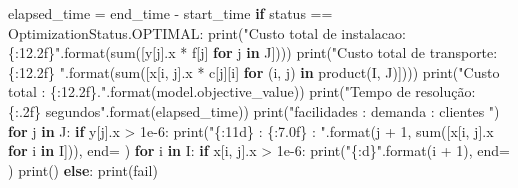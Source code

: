 \documentclass[
  letterpaper,
  DIV=11,
  numbers=noendperiod]{scrartcl}
\newenvironment{Shaded}{\begin{snugshade}}{\end{snugshade}}
\newcommand{\BuiltInTok}[1]{\textcolor[rgb]{0.00,0.23,0.31}{#1}}
\newcommand{\ControlFlowTok}[1]{\textcolor[rgb]{0.00,0.23,0.31}{\textbf{#1}}}
\newcommand{\DecValTok}[1]{\textcolor[rgb]{0.68,0.00,0.00}{#1}}
\newcommand{\FloatTok}[1]{\textcolor[rgb]{0.68,0.00,0.00}{#1}}
\newcommand{\KeywordTok}[1]{\textcolor[rgb]{0.00,0.23,0.31}{\textbf{#1}}}
\newcommand{\NormalTok}[1]{\textcolor[rgb]{0.00,0.23,0.31}{#1}}
\newcommand{\OperatorTok}[1]{\textcolor[rgb]{0.37,0.37,0.37}{#1}}
\newcommand{\SpecialCharTok}[1]{\textcolor[rgb]{0.37,0.37,0.37}{#1}}
\newcommand{\StringTok}[1]{\textcolor[rgb]{0.13,0.47,0.30}{#1}}
\begin{document}
\begin{Shaded}
\begin{Highlighting}[]
\NormalTok{    elapsed\_time }\OperatorTok{=}\NormalTok{ end\_time }\OperatorTok{{-}}\NormalTok{ start\_time    }
    \ControlFlowTok{if}\NormalTok{ status }\OperatorTok{==}\NormalTok{ OptimizationStatus.OPTIMAL:}
        \BuiltInTok{print}\NormalTok{(}\StringTok{"Custo total de instalacao: }\SpecialCharTok{\{:12.2f\}}\StringTok{"}\NormalTok{.}\BuiltInTok{format}\NormalTok{(}\BuiltInTok{sum}\NormalTok{([y[j].x }\OperatorTok{*}\NormalTok{ f[j] }\ControlFlowTok{for}\NormalTok{ j }\KeywordTok{in}\NormalTok{ J])))}
        \BuiltInTok{print}\NormalTok{(}\StringTok{"Custo total de transporte: }\SpecialCharTok{\{:12.2f\}}\StringTok{ "}\NormalTok{.}\BuiltInTok{format}\NormalTok{(}\BuiltInTok{sum}\NormalTok{([x[i, j].x }\OperatorTok{*}\NormalTok{ c[j][i] }\ControlFlowTok{for}\NormalTok{ (i, j) }\KeywordTok{in}\NormalTok{ product(I, J)])))}
        \BuiltInTok{print}\NormalTok{(}\StringTok{"Custo total : }\SpecialCharTok{\{:12.2f\}}\StringTok{."}\NormalTok{.}\BuiltInTok{format}\NormalTok{(model.objective\_value))}
        \BuiltInTok{print}\NormalTok{(}\StringTok{"Tempo de resolução: }\SpecialCharTok{\{:.2f\}}\StringTok{ segundos"}\NormalTok{.}\BuiltInTok{format}\NormalTok{(elapsed\_time))}
        \BuiltInTok{print}\NormalTok{(}\StringTok{"facilidades : demanda : clientes "}\NormalTok{)}
        \ControlFlowTok{for}\NormalTok{ j }\KeywordTok{in}\NormalTok{ J:}
            \ControlFlowTok{if}\NormalTok{ y[j].x }\OperatorTok{\textgreater{}} \FloatTok{1e{-}6}\NormalTok{:}
                \BuiltInTok{print}\NormalTok{(}\StringTok{"}\SpecialCharTok{\{:11d\}}\StringTok{ : }\SpecialCharTok{\{:7.0f\}}\StringTok{ : "}\NormalTok{.}\BuiltInTok{format}\NormalTok{(j }\OperatorTok{+} \DecValTok{1}\NormalTok{, }\BuiltInTok{sum}\NormalTok{([x[i, j].x }\ControlFlowTok{for}\NormalTok{ i }\KeywordTok{in}\NormalTok{ I])), end}\OperatorTok{=}\StringTok{\textquotesingle{} \textquotesingle{}}\NormalTok{)}
                \ControlFlowTok{for}\NormalTok{ i }\KeywordTok{in}\NormalTok{ I:}
                    \ControlFlowTok{if}\NormalTok{ x[i, j].x }\OperatorTok{\textgreater{}} \FloatTok{1e{-}6}\NormalTok{:}
                        \BuiltInTok{print}\NormalTok{(}\StringTok{"}\SpecialCharTok{\{:d\}}\StringTok{"}\NormalTok{.}\BuiltInTok{format}\NormalTok{(i }\OperatorTok{+} \DecValTok{1}\NormalTok{), end}\OperatorTok{=}\StringTok{\textquotesingle{} \textquotesingle{}}\NormalTok{)}
                \BuiltInTok{print}\NormalTok{()}
    \ControlFlowTok{else}\NormalTok{: }\BuiltInTok{print}\NormalTok{(}\StringTok{\textquotesingle{}fail\textquotesingle{}}\NormalTok{)}
\end{Highlighting}
\end{Shaded}
\end{document}
